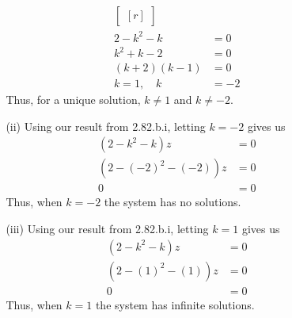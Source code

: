 \documentclass[12pt]{article}
\begin{document}
\begin{enumerate}
\begin{enumerate}
\begin{enumerate}
\begin{align*}
\begin{bmatrix}[r]
		\end{bmatrix}\\
		2-k^2-k &=0\\
		k^2+k-2 &= 0\\
		(k+2)(k-1) &=0\\
		k=1, \quad k&=-2
		\end{align*}	
		Thus, for a unique solution, $k \neq 1$ and $k \neq -2$.\\
		\item [(ii)]
		Using our result from 2.82.b.i, letting $k=-2$ gives us
		\begin{align*}
		(2-k^2-k)z &= 0\\
		(2-(-2)^2-(-2))z &= 0\\
		0 &= 0
		\end{align*}
		Thus, when $k=-2$ the system has no solutions.\\

		\pagebreak
		\item [(iii)]
		Using our result from 2.82.b.i, letting $k = 1$ gives us
		\begin{align*}
		(2-k^2-k)z &= 0\\
		(2-(1)^2-(1))z &= 0\\
		0 &= 0
		\end{align*}
		Thus, when $k=1$ the system has infinite solutions.\\
		

\end{enumerate}
\end{enumerate}
\end{enumerate}
\end{document}
